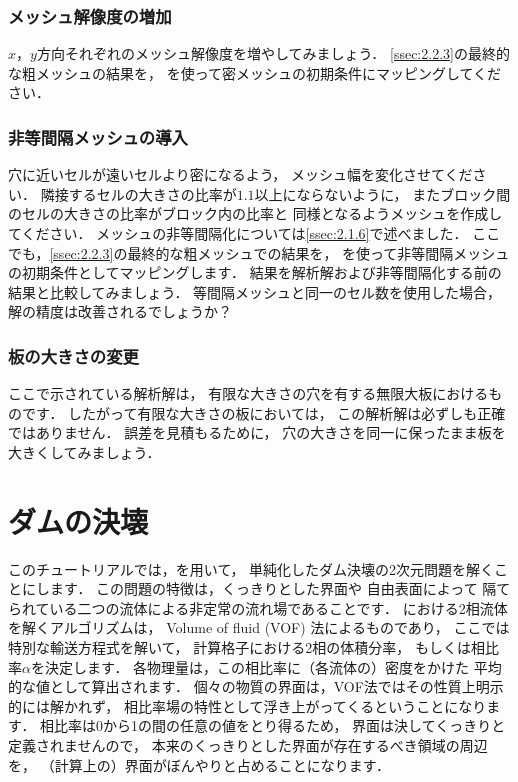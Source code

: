 \subsubsection{メッシュ解像度の増加}
\label{sssec:2.2.4.1}
$x$，$y$方向それぞれのメッシュ解像度を増やしてみましょう．
\autoref{ssec:2.2.3}の最終的な粗メッシュの結果を，
%
%
を使って密メッシュの初期条件にマッピングしてください．

\subsubsection{非等間隔メッシュの導入}
\label{sssec:2.2.4.2}
穴に近いセルが遠いセルより密になるよう，
メッシュ幅を変化させてください．
隣接するセルの大きさの比率が$1.1$以上にならないように，
またブロック間のセルの大きさの比率がブロック内の比率と
同様となるようメッシュを作成してください．
メッシュの非等間隔化については\autoref{ssec:2.1.6}で述べました．
ここでも，\autoref{ssec:2.2.3}の最終的な粗メッシュでの結果を，
を使って非等間隔メッシュの初期条件としてマッピングします．
結果を解析解および非等間隔化する前の結果と比較してみましょう．
等間隔メッシュと同一のセル数を使用した場合，
解の精度は改善されるでしょうか？

\subsubsection{板の大きさの変更}
\label{sssec:2.2.4.3}
ここで示されている解析解は，
有限な大きさの穴を有する無限大板におけるものです．
したがって有限な大きさの板においては，
この解析解は必ずしも正確ではありません．
誤差を見積もるために，
穴の大きさを同一に保ったまま板を大きくしてみましょう．



\section{ダムの決壊}
\label{sec:2.3}
%
%
このチュートリアルでは，を用いて，
単純化したダム決壊の2次元問題を解くことにします．
この問題の特徴は，くっきりとした界面や
%
自由表面によって
隔てられている二つの流体による非定常の流れ場であることです．
における2相流体を解くアルゴリズムは，
Volume of fluid (VOF) 法によるものであり，
ここでは特別な輸送方程式を解いて，
計算格子における2相の体積分率，
もしくは相比率$\alpha$を決定します．
各物理量は，この相比率に（各流体の）密度をかけた
平均的な値として算出されます．
個々の物質の界面は，VOF法ではその性質上明示的には解かれず，
相比率場の特性として浮き上がってくるということになります．
相比率は0から1の間の任意の値をとり得るため，
界面は決してくっきりと定義されませんので，
本来のくっきりとした界面が存在するべき領域の周辺を，
（計算上の）界面がぼんやりと占めることになります．

